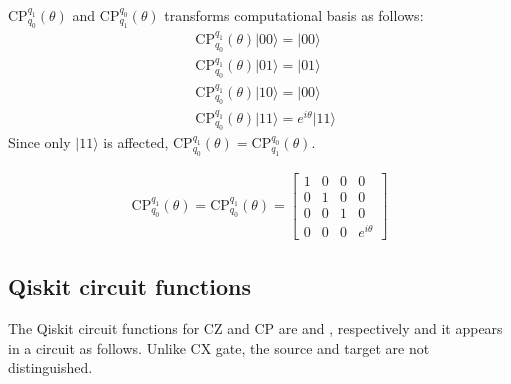 \documentclass[letterpaper,10pt,english]{jupyterBook}
\begin{document}
\sphinxAtStartPar
CP\(_{q_0}^{q_1}(\theta)\) and CP\(_{q_1}^{q_0}(\theta)\) transforms computational basis as follows:
\begin{align}
&\text{CP}_{q_0}^{q_1}(\theta) \lvert 00\rangle = \lvert 00\rangle\\
&\text{CP}_{q_0}^{q_1}(\theta) \lvert 01\rangle = \lvert 01\rangle\\
&\text{CP}_{q_0}^{q_1}(\theta) \lvert 10\rangle = \lvert 00\rangle\\
&\text{CP}_{q_0}^{q_1}(\theta) \lvert 11\rangle = e^{i \theta}\lvert 11\rangle
\end{align}
\sphinxAtStartPar
Since only \(\lvert 11\rangle\) is affected, \(\text{CP}_{q_0}^{q_1}(\theta)= \text{CP}_{q_1}^{q_0}(\theta)\).

\sphinxAtStartPar
{}
\begin{equation*}
\begin{split}
\text{CP}_{q_0}^{q_1}(\theta) = \text{CP}_{q_0}^{q_1}(\theta)  = \begin{bmatrix} 1&0&0&0\\0&1&0&0\\0&0&1&0\\0&0&0&e^{i\theta}\end{bmatrix}
\end{split}
\end{equation*}

\subsection{Qiskit circuit functions}
\label{\detokenize{q2gates/cp:qiskit-circuit-functions}}
\sphinxAtStartPar
The Qiskit circuit functions for CZ and CP are  and , respectively and it appears in a circuit as follows.  Unlike CX gate, the source and target are not distinguished.
\end{document}
